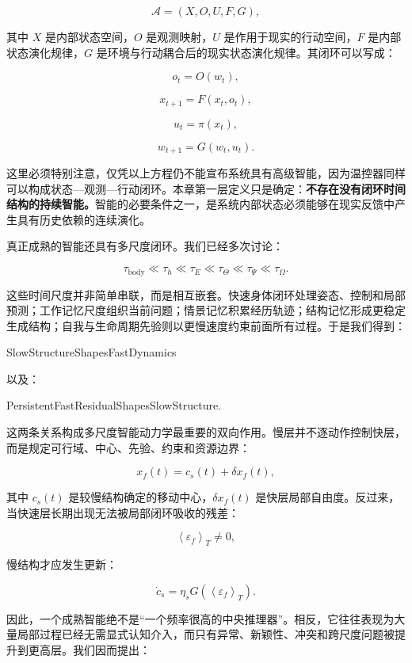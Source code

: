 \[
\mathcal A
=
(
X,
O,
U,
F,
G
),
\]

其中 \(X\) 是内部状态空间，\(O\) 是观测映射，\(U\) 是作用于现实的行动空间，\(F\) 是内部状态演化规律，\(G\) 是环境与行动耦合后的现实状态演化规律。其闭环可以写成：

\[
o_t
=
O(w_t),
\]

\[
x_{t+1}
=
F(x_t,o_t),
\]

\[
u_t
=
\pi(x_t),
\]

\[
w_{t+1}
=
G(w_t,u_t).
\]

这里必须特别注意，仅凭以上方程仍不能宣布系统具有高级智能，因为温控器同样可以构成状态—观测—行动闭环。本章第一层定义只是确定：\textbf{不存在没有闭环时间结构的持续智能。}智能的必要条件之一，是系统内部状态必须能够在现实反馈中产生具有历史依赖的连续演化。

真正成熟的智能还具有多尺度闭环。我们已经多次讨论：

\[
\tau_{\mathrm{body}}
\ll
\tau_h
\ll
\tau_E
\ll
\tau_{\Theta}
\ll
\tau_{\Psi}
\ll
\tau_{\Omega}.
\]

这些时间尺度并非简单串联，而是相互嵌套。快速身体闭环处理姿态、控制和局部预测；工作记忆尺度组织当前问题；情景记忆积累经历轨迹；结构记忆形成更稳定生成结构；自我与生命周期先验则以更慢速度约束前面所有过程。于是我们得到：

\begin{statementbox}
SlowStructureShapesFastDynamics
\end{statementbox}

以及：

\begin{statementbox}
PersistentFastResidualShapesSlowStructure.
\end{statementbox}

这两条关系构成多尺度智能动力学最重要的双向作用。慢层并不逐动作控制快层，而是规定可行域、中心、先验、约束和资源边界：

\[
x_f(t)
=
c_s(t)
+
\delta x_f(t),
\]

其中 \(c_s(t)\) 是较慢结构确定的移动中心，\(\delta x_f(t)\) 是快层局部自由度。反过来，当快速层长期出现无法被局部闭环吸收的残差：

\[
\left\langle
\varepsilon_f
\right\rangle_T
\neq
0,
\]

慢结构才应发生更新：

\[
\dot c_s
=
\eta_s
G
\left(
\left\langle
\varepsilon_f
\right\rangle_T
\right).
\]

因此，一个成熟智能绝不是“一个频率很高的中央推理器”。相反，它往往表现为大量局部过程已经无需显式认知介入，而只有异常、新颖性、冲突和跨尺度问题被提升到更高层。我们因而提出：

